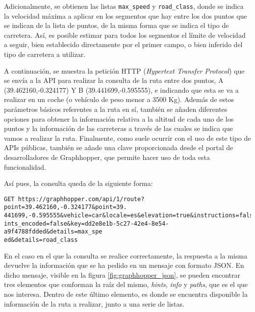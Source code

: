 \documentclass[11pt,spanish,listoffigures,listoftables]{tfgetsinf}
\begin{document}
Adicionalmente, se obtienen las listas \verb|max_speed| y \verb|road_class|, donde se indica la velocidad máxima a aplicar en los segmentos que hay entre los dos puntos que se indican de la lista de puntos, de la misma forma que se indica el tipo de carretera. Así, es posible estimar para todos los segmentos el límite de velocidad a seguir, bien establecido directamente por el primer campo, o bien inferido del tipo de carretera a utilizar.

A continuación, se muestra la petición HTTP (\textit{Hypertext Transfer Protocol}) que se envía a la API para realizar la consulta de la ruta entre dos puntos, A (39.462160,-0.324177) Y B (39.441699,-0.595555), e indicando que esta se va a realizar en un coche (o vehículo de peso menor a 3500 Kg). Además de estos parámetros básicos referentes a la ruta en sí, también se añaden diferentes opciones para obtener la información relativa a la altitud de cada uno de los puntos y la información de las carreteras a través de las cuales se indica que vamos a realizar la ruta. Finalmente, como suele ocurrir con el uso de este tipo de APIs públicas, también se añade una clave proporcionada desde el portal de desarrolladores de Graphhopper, que permite hacer uso de toda esta funcionalidad.

\noindent Así pues, la consulta queda de la siguiente forma:
\begin{verbatim}
GET https://graphhopper.com/api/1/route?point=39.462160,-0.324177&point=39.
441699,-0.595555&vehicle=car&locale=es&elevation=true&instructions=false&po
ints_encoded=false&key=dd2e8e1b-5c27-42e4-8e54-a9f4788fdded&details=max_spe
ed&details=road_class
\end{verbatim}

En el caso en el que la consulta se realice correctamente, la respuesta a la misma devuelve la información que se ha pedido en un mensaje con formato JSON. En dicho mensaje, visible en la figura \ref{fig:graphhopper_json}, se pueden encontrar tres elementos que conforman la raíz del mismo, \textit{hints}, \textit{info} y \textit{paths}, que es el que nos interesa. Dentro de este último elemento, es donde se encuentra disponible la información de la ruta a realizar, junto a una serie de listas.
\end{document}

